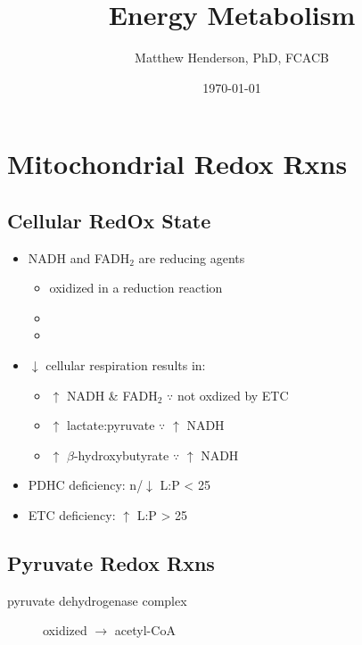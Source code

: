 \documentclass{scrartcl}
\author{Matthew Henderson, PhD, FCACB}
\date{\today}
\title{Energy Metabolism}
\begin{document}
\maketitle
\tableofcontents


\section{Mitochondrial Redox Rxns}
\label{sec:org793ba9d}
\subsection{Cellular RedOx State}
\label{sec:org11da004}
\begin{itemize}
\item NADH and FADH\(_{\text{2}}\) are reducing agents
\begin{itemize}
\item oxidized in a reduction reaction
\item {}
\item {}
\end{itemize}
\item \(\downarrow\) cellular respiration results in:
\begin{itemize}
\item \(\uparrow\) NADH \& FADH\(_{\text{2}}\) \(\because\) not oxdized by ETC
\item \(\uparrow\) lactate:pyruvate \(\because\) \(\uparrow\) NADH
\item \(\uparrow\) \(\beta\)-hydroxybutyrate  \(\because\) \(\uparrow\) NADH
\end{itemize}

\item PDHC deficiency: n/\(\downarrow\) L:P < 25
\item ETC deficiency: \(\uparrow\) L:P > 25
\end{itemize}

\subsection{Pyruvate Redox Rxns}
\label{sec:orge14f821}
\begin{description}
\item[{pyruvate dehydrogenase complex}] oxidized \(\to\) acetyl-CoA
\end{description}

\end{document}
